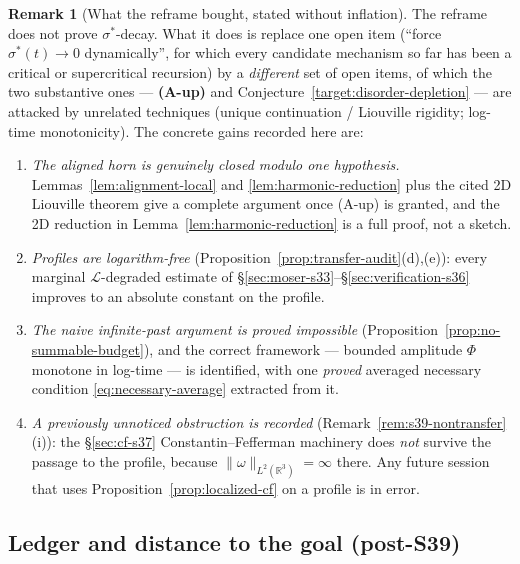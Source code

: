\documentclass[11pt]{article}
\theoremstyle{definition}
\newtheorem{remark}[theorem]{Remark}
\theoremstyle{remark}
\newcommand{\R}{\mathbb{R}}
\begin{document}
\begin{remark}[What the reframe bought, stated without inflation]
  \label{rem:s39-bought}
  The reframe does not prove $\sigma^*$-decay. What it does is replace one
  open item (``force $\sigma^*(t)\to0$ dynamically'', for which every
  candidate mechanism so far has been a critical or supercritical recursion)
  by a \emph{different} set of open items, of which the two substantive ones
  --- \textbf{(A-up)} and Conjecture~\ref{target:disorder-depletion} --- are
  attacked by unrelated techniques (unique continuation / Liouville rigidity;
  log-time monotonicity). The concrete gains recorded here are:
  \begin{enumerate}[label=(\arabic*)]
  \item \emph{The aligned horn is genuinely closed modulo one hypothesis.}
    Lemmas~\ref{lem:alignment-local} and \ref{lem:harmonic-reduction} plus
    the cited 2D Liouville theorem give a complete argument once (A-up) is
    granted, and the 2D reduction in
    Lemma~\ref{lem:harmonic-reduction} is a full proof, not a sketch.
  \item \emph{Profiles are logarithm-free}
    (Proposition~\ref{prop:transfer-audit}(d),(e)): every marginal
    $\mathcal{L}$-degraded estimate of
    \S\ref{sec:moser-s33}--\S\ref{sec:verification-s36} improves to an
    absolute constant on the profile.
  \item \emph{The naive infinite-past argument is proved impossible}
    (Proposition~\ref{prop:no-summable-budget}), and the correct framework
    --- bounded amplitude $\Phi$ monotone in log-time --- is identified,
    with one \emph{proved} averaged necessary condition
    \eqref{eq:necessary-average} extracted from it.
  \item \emph{A previously unnoticed obstruction is recorded}
    (Remark~\ref{rem:s39-nontransfer}(i)): the \S\ref{sec:cf-s37}
    Constantin--Fefferman machinery does \emph{not} survive the passage to
    the profile, because $\|\omega\|_{L^2(\R^3)}=\infty$ there. Any future
    session that uses Proposition~\ref{prop:localized-cf} on a profile is in
    error.
  \end{enumerate}
\end{remark}

\subsection{Ledger and distance to the goal (post-S39)}
\end{document}
